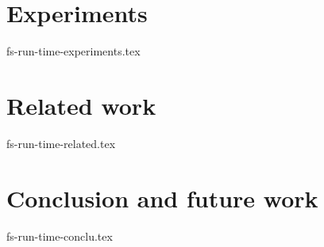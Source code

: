 \documentclass[14pt]{matmex-diploma-custom}
\theoremstyle{remark}
\begin{document}
\section {Experiments}
 {fs-run-time-experiments.tex}

\section {Related work}
 {fs-run-time-related.tex}

\section* {Conclusion and future work}
 {fs-run-time-conclu.tex}

\setmonofont[Mapping=tex-text]{CMU Typewriter Text}


\end{document}
